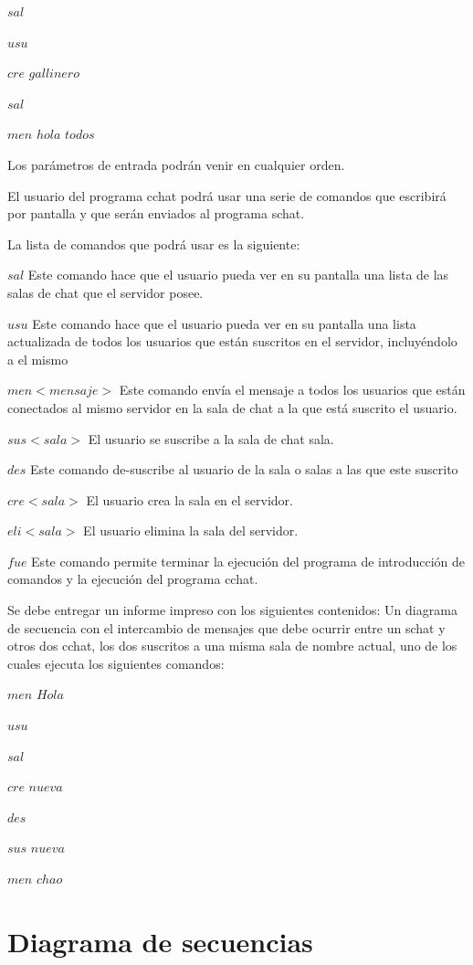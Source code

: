 \documentclass[11pt, spanish]{extarticle}
\begin{document}
$sal$

$usu$

$cre$
$ gallinero$

$sal$

$men $
$hola $
$todos$
 
Los parámetros de entrada podrán venir en cualquier orden. 
 
El usuario del programa cchat podrá usar una serie de comandos que escribirá por pantalla 
y que serán enviados al programa schat. 

La lista de comandos que podrá usar es la siguiente: 

$sal$ Este comando hace que el usuario pueda ver en su pantalla una lista de las salas de 
chat que el servidor posee. 

$usu$ Este comando hace que el usuario pueda ver en su pantalla una lista actualizada de 
todos los usuarios que están suscritos en el servidor, incluyéndolo a el mismo 

$men <mensaje>$ Este comando envía el mensaje a todos los usuarios que están 
conectados al mismo servidor en la sala de chat a la que está suscrito el usuario. 

$sus <sala>$ El usuario se suscribe a la sala de chat sala. 

$des$ Este comando de-suscribe al usuario de la sala o salas a las que este suscrito 

$cre <sala>$ El usuario crea la sala en el servidor. 

$eli <sala>$ El usuario elimina la sala del servidor. 

$fue$ Este comando permite terminar la ejecución del programa de introducción de 
comandos y la ejecución del programa cchat. 

Se debe entregar un informe impreso con los siguientes contenidos:
Un diagrama de secuencia con el intercambio de mensajes que debe ocurrir entre un schat y
otros dos cchat, los dos suscritos a una misma sala de nombre actual, uno de los cuales
ejecuta los siguientes comandos:

$men$ 
$ Hola$

$usu$

$sal$

$cre$
$ nueva$

$des$

$sus $
$nueva$

$men $
$chao$
\clearpage

\section{Diagrama de secuencias}
\end{document}
